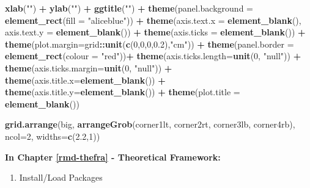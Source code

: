 \documentclass[12pt,oneside]{reedthesis}
\newenvironment{Shaded}{\begin{snugshade}}{\end{snugshade}}
\newcommand{\DataTypeTok}[1]{\textcolor[rgb]{0.13,0.29,0.53}{#1}}
\newcommand{\DecValTok}[1]{\textcolor[rgb]{0.00,0.00,0.81}{#1}}
\newcommand{\FloatTok}[1]{\textcolor[rgb]{0.00,0.00,0.81}{#1}}
\newcommand{\KeywordTok}[1]{\textcolor[rgb]{0.13,0.29,0.53}{\textbf{#1}}}
\newcommand{\NormalTok}[1]{#1}
\newcommand{\OperatorTok}[1]{\textcolor[rgb]{0.81,0.36,0.00}{\textbf{#1}}}
\newcommand{\StringTok}[1]{\textcolor[rgb]{0.31,0.60,0.02}{#1}}
\providecommand{\tightlist}{%
  \setlength{\itemsep}{0pt}\setlength{\parskip}{0pt}}
\begin{document}
\begin{Shaded}
\begin{Highlighting}[]
\StringTok{  }\KeywordTok{xlab}\NormalTok{(}\StringTok{""}\NormalTok{) }\OperatorTok{+}\StringTok{ }
\StringTok{  }\KeywordTok{ylab}\NormalTok{(}\StringTok{""}\NormalTok{) }\OperatorTok{+}\StringTok{ }
\StringTok{  }\KeywordTok{ggtitle}\NormalTok{(}\StringTok{""}\NormalTok{) }\OperatorTok{+}
\StringTok{  }\KeywordTok{theme}\NormalTok{(}\DataTypeTok{panel.background =} \KeywordTok{element_rect}\NormalTok{(}\DataTypeTok{fill =} \StringTok{"aliceblue"}\NormalTok{)) }\OperatorTok{+}
\StringTok{  }\KeywordTok{theme}\NormalTok{(}\DataTypeTok{axis.text.x =} \KeywordTok{element_blank}\NormalTok{(), }\DataTypeTok{axis.text.y =} \KeywordTok{element_blank}\NormalTok{()) }\OperatorTok{+}
\StringTok{  }\KeywordTok{theme}\NormalTok{(}\DataTypeTok{axis.ticks =} \KeywordTok{element_blank}\NormalTok{()) }\OperatorTok{+}
\StringTok{  }\KeywordTok{theme}\NormalTok{(}\DataTypeTok{plot.margin=}\NormalTok{grid}\OperatorTok{::}\KeywordTok{unit}\NormalTok{(}\KeywordTok{c}\NormalTok{(}\DecValTok{0}\NormalTok{,}\DecValTok{0}\NormalTok{,}\DecValTok{0}\NormalTok{,}\FloatTok{0.2}\NormalTok{),}\StringTok{"cm"}\NormalTok{)) }\OperatorTok{+}\StringTok{ }
\StringTok{  }\KeywordTok{theme}\NormalTok{(}\DataTypeTok{panel.border =} \KeywordTok{element_rect}\NormalTok{(}\DataTypeTok{colour =} \StringTok{"red"}\NormalTok{))}\OperatorTok{+}
\StringTok{  }\KeywordTok{theme}\NormalTok{(}\DataTypeTok{axis.ticks.length=}\KeywordTok{unit}\NormalTok{(}\DecValTok{0}\NormalTok{, }\StringTok{"null"}\NormalTok{)) }\OperatorTok{+}
\StringTok{  }\KeywordTok{theme}\NormalTok{(}\DataTypeTok{axis.ticks.margin=}\KeywordTok{unit}\NormalTok{(}\DecValTok{0}\NormalTok{, }\StringTok{"null"}\NormalTok{)) }\OperatorTok{+}
\StringTok{  }\KeywordTok{theme}\NormalTok{(}\DataTypeTok{axis.title.x=}\KeywordTok{element_blank}\NormalTok{()) }\OperatorTok{+}
\StringTok{  }\KeywordTok{theme}\NormalTok{(}\DataTypeTok{axis.title.y=}\KeywordTok{element_blank}\NormalTok{()) }\OperatorTok{+}
\StringTok{  }\KeywordTok{theme}\NormalTok{(}\DataTypeTok{plot.title =} \KeywordTok{element_blank}\NormalTok{())}

\KeywordTok{grid.arrange}\NormalTok{(big, }\KeywordTok{arrangeGrob}\NormalTok{(corner1lt, corner2rt, corner3lb, corner4rb), }\DataTypeTok{ncol=}\DecValTok{2}\NormalTok{, }\DataTypeTok{widths=}\KeywordTok{c}\NormalTok{(}\FloatTok{2.2}\NormalTok{,}\DecValTok{1}\NormalTok{))}
\end{Highlighting}
\end{Shaded}
\normalsize

\textbf{In Chapter \ref{rmd-thefra} - Theoretical Framework:}
\begin{enumerate}
\def\labelenumi{\arabic{enumi}.}
\tightlist
\item
  Install/Load Packages
\end{enumerate}
\tiny
\end{document}
